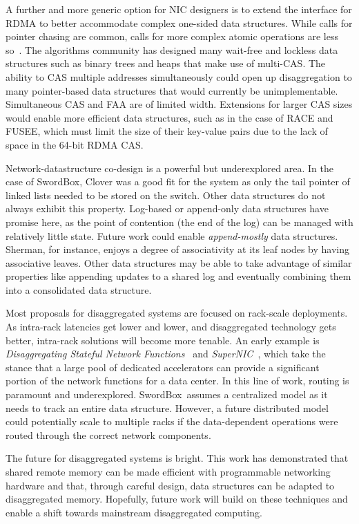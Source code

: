 \documentclass[12pt]{ucsddissertation}
\newcommand{\sword}{SwordBox}
\begin{document}
A further and more generic option for NIC designers is to extend the interface for RDMA to better
accommodate complex one-sided data structures. While calls for pointer chasing are common, calls for
more complex atomic operations are less so~\cite{prism, clio}. The algorithms community has designed
many wait-free and lockless data structures such as binary trees and heaps that make use of
multi-CAS. The ability to CAS multiple addresses simultaneously could open up disaggregation to many
pointer-based data structures that would currently be unimplementable. Simultaneous CAS and FAA are
of limited width. Extensions for larger CAS sizes would enable more efficient data structures, such
as in the case of RACE and FUSEE, which must limit the size of their key-value pairs due to the lack
of space in the 64-bit RDMA CAS.

Network-datastructure co-design is a powerful but underexplored area. In the case of \sword, Clover
was a good fit for the system as only the tail pointer of linked lists needed to be stored on the
switch. Other data structures do not always exhibit this property. Log-based or append-only data
structures have promise here, as the point of contention (the end of the log) can be managed with
relatively little state. Future work could enable \textit{append-mostly} data structures. Sherman,
for instance, enjoys a degree of associativity at its leaf nodes by having associative leaves. Other
data structures may be able to take advantage of similar properties like appending updates to a
shared log and eventually combining them into a consolidated data structure.

Most proposals for disaggregated systems are focused on rack-scale deployments. As intra-rack
latencies get lower and lower, and disaggregated technology gets better, intra-rack solutions will
become more tenable. An early example is \textit{Disaggregating Stateful Network
Functions}~\cite{dsnf} and \textit{SuperNIC}~\cite{supernic}, which take the stance that a large
pool of dedicated accelerators can provide a significant portion of the network functions for a data
center. In this line of work, routing is paramount and underexplored. \sword\ assumes a centralized
model as it needs to track an entire data structure. However, a future distributed model could
potentially scale to multiple racks if the data-dependent operations were routed through the correct
network components.

The future for disaggregated systems is bright. This work has demonstrated that shared remote memory
can be made efficient with programmable networking hardware and that, through careful design, data
structures can be adapted to disaggregated memory. Hopefully, future work will build on these
techniques and enable a shift towards mainstream disaggregated computing.
\end{document}
